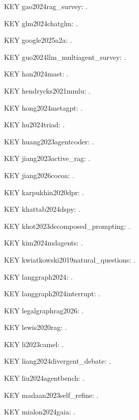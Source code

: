 \documentclass[a4paper,fleqn]{cas-dc}
\begin{document}
\noindent KEY gao2024rag\_survey: \citep{gao2024rag_survey}.\par
\noindent KEY glm2024chatglm: \citep{glm2024chatglm}.\par
\noindent KEY google2025a2a: \citep{google2025a2a}.\par
\noindent KEY guo2024llm\_multiagent\_survey: \citep{guo2024llm_multiagent_survey}.\par
\noindent KEY han2024mast: \citep{han2024mast}.\par
\noindent KEY hendrycks2021mmlu: \citep{hendrycks2021mmlu}.\par
\noindent KEY hong2024metagpt: \citep{hong2024metagpt}.\par
\noindent KEY hu2024triad: \citep{hu2024triad}.\par
\noindent KEY huang2023agentcoder: \citep{huang2023agentcoder}.\par
\noindent KEY jiang2023active\_rag: \citep{jiang2023active_rag}.\par
\noindent KEY jiang2026cocoa: \citep{jiang2026cocoa}.\par
\noindent KEY karpukhin2020dpr: \citep{karpukhin2020dpr}.\par
\noindent KEY khattab2024dspy: \citep{khattab2024dspy}.\par
\noindent KEY khot2023decomposed\_prompting: \citep{khot2023decomposed_prompting}.\par
\noindent KEY kim2024mdagents: \citep{kim2024mdagents}.\par
\noindent KEY kwiatkowski2019natural\_questions: \citep{kwiatkowski2019natural_questions}.\par
\noindent KEY langgraph2024: \citep{langgraph2024}.\par
\noindent KEY langgraph2024interrupt: \citep{langgraph2024interrupt}.\par
\noindent KEY legalgraphrag2026: \citep{legalgraphrag2026}.\par
\noindent KEY lewis2020rag: \citep{lewis2020rag}.\par
\noindent KEY li2023camel: \citep{li2023camel}.\par
\noindent KEY liang2024divergent\_debate: \citep{liang2024divergent_debate}.\par
\noindent KEY liu2024agentbench: \citep{liu2024agentbench}.\par
\noindent KEY madaan2023self\_refine: \citep{madaan2023self_refine}.\par
\noindent KEY mialon2024gaia: \citep{mialon2024gaia}.\par
\end{document}
